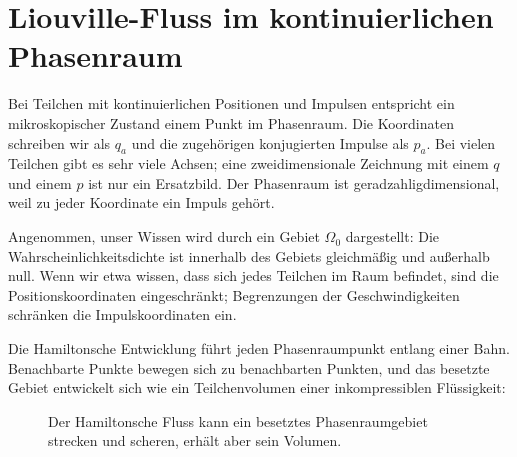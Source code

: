 \begin{classroomqa}\end{classroomqa}

\section{Liouville-Fluss im kontinuierlichen Phasenraum}

Bei Teilchen mit kontinuierlichen Positionen und Impulsen entspricht ein mikroskopischer Zustand einem Punkt im Phasenraum. Die Koordinaten schreiben wir als \(q_a\) und die zugehörigen konjugierten Impulse als \(p_a\). Bei vielen Teilchen gibt es sehr viele Achsen; eine zweidimensionale Zeichnung mit einem \(q\) und einem \(p\) ist nur ein Ersatzbild. Der Phasenraum ist geradzahligdimensional, weil zu jeder Koordinate ein Impuls gehört.

Angenommen, unser Wissen wird durch ein Gebiet \(\Omega_0\) dargestellt: Die Wahrscheinlichkeitsdichte ist innerhalb des Gebiets gleichmäßig und außerhalb null. Wenn wir etwa wissen, dass sich jedes Teilchen im Raum befindet, sind die Positionskoordinaten eingeschränkt; Begrenzungen der Geschwindigkeiten schränken die Impulskoordinaten ein.

Die Hamiltonsche Entwicklung führt jeden Phasenraumpunkt entlang einer Bahn. Benachbarte Punkte bewegen sich zu benachbarten Punkten, und das besetzte Gebiet entwickelt sich wie ein Teilchenvolumen einer inkompressiblen Flüssigkeit:
\begin{figure}[htbp]\centering
{}\caption{Der Hamiltonsche Fluss kann ein besetztes Phasenraumgebiet strecken und scheren, erhält aber sein Volumen.}\label{fig:sm1-liouville-flow}\end{figure}

